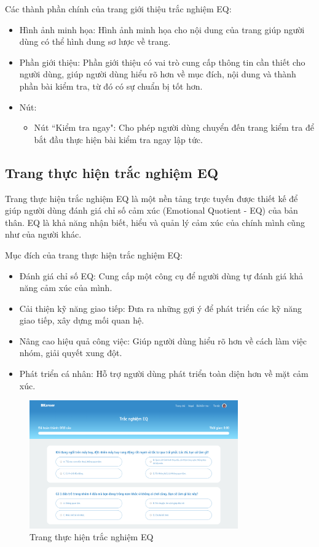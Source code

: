 Các thành phần chính của trang giới thiệu trắc nghiệm EQ:
\begin{itemize}
    \item Hình ảnh minh họa: Hình ảnh minh họa cho nội dung của trang giúp người dùng có thể hình dung sơ lược về trang.
    \item Phần giới thiệu: Phần giới thiệu có vai trò cung cấp thông tin cần thiết cho người dùng, giúp người dùng hiểu rõ hơn về mục đích, nội dung và thành phần bài kiểm tra, từ đó có sự chuẩn bị tốt hơn.
    \item Nút:
        \begin{itemize}
            \item Nút ``Kiểm tra ngay": Cho phép người dùng chuyển đến trang kiểm tra để bắt đầu thực hiện bài kiểm tra ngay lập tức.
        \end{itemize}
\end{itemize}


\subsection{Trang thực hiện trắc nghiệm EQ}
Trang thực hiện trắc nghiệm EQ là một nền tảng trực tuyến được thiết kế để giúp người dùng đánh giá chỉ số cảm xúc (Emotional Quotient - EQ) của bản thân. EQ là khả năng nhận biết, hiểu và quản lý cảm xúc của chính mình cũng như của người khác.

Mục đích của trang thực hiện trắc nghiệm EQ:
\begin{itemize}
    \item Đánh giá chỉ số EQ: Cung cấp một công cụ để người dùng tự đánh giá khả năng cảm xúc của mình.
    \item Cải thiện kỹ năng giao tiếp: Đưa ra những gợi ý để phát triển các kỹ năng giao tiếp, xây dựng mối quan hệ.
    \item Nâng cao hiệu quả công việc: Giúp người dùng hiểu rõ hơn về cách làm việc nhóm, giải quyết xung đột.
    \item Phát triển cá nhân: Hỗ trợ người dùng phát triển toàn diện hơn về mặt cảm xúc.
\end{itemize}

\begin{figure}[H]
    \centering
    \includegraphics[width=0.8\textwidth]
    {images/chap5/eq.png}
    \vspace{0.5cm}
    \caption{Trang thực hiện trắc nghiệm EQ}
\end{figure}

